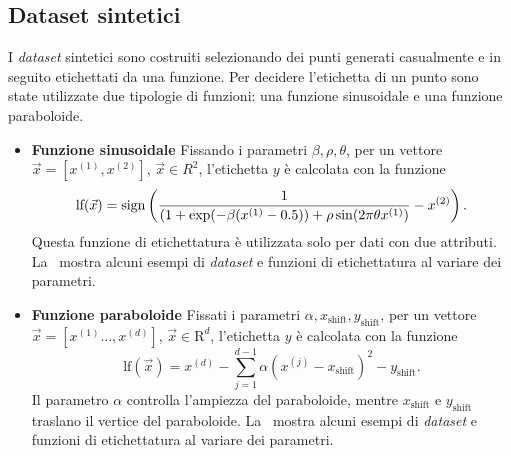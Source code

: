 \subsection{Dataset sintetici}
I \emph{dataset} sintetici sono costruiti selezionando dei punti generati casualmente e in seguito etichettati da una funzione.
Per decidere l'etichetta di un punto sono state utilizzate due tipologie di funzioni: una funzione sinusoidale e una funzione paraboloide.
\begin{itemize}
    \item \textbf{Funzione sinusoidale} Fissando i parametri $\beta,\rho,\theta$, per un vettore $\Vec{x}=[x^{(1)},x^{(2)}]$, $\Vec{x} \in R^2$, l'etichetta $y$ è calcolata con la funzione
    \begin{equation}\label{eq:sinusoid_dataset_lf}
    \textrm{lf}(\Vec{x}) = \mathrm{sign}\left(\frac{1}{(1 + \exp(-\beta(x^{(1)} - 0.5)) + \rho \sin(2\pi\theta x^{(1)})} - x^{(2)}\right).
    \end{equation}
    Questa funzione di etichettatura è utilizzata solo per dati con due attributi. La~ mostra alcuni esempi di \emph{dataset} e funzioni di etichettatura al variare dei parametri.

    \item \textbf{Funzione paraboloide} Fissati i parametri $\alpha, x_\text{shift}, y_\text{shift}$, per un vettore $\Vec{x}=[x^{(1)}\dots, x^{(d)}]$, $\Vec{x} \in \mathrm{R}^d$, l'etichetta $y$ è calcolata con la funzione
    \begin{equation}\label{eq:pacman_dataset_lf}
    \textrm{lf}(\Vec{x})= x^{(d)} - \sum_{j=1}^{d-1}\alpha(x^{(j)} - x_\text{shift})^2 - y_\text{shift}.
    \end{equation}
    Il parametro $\alpha$ controlla l'ampiezza del paraboloide, mentre $x_\text{shift}$ e $y_\text{shift}$ traslano il vertice del paraboloide.
    La~ mostra alcuni esempi di \emph{dataset} e funzioni di etichettatura al variare dei parametri.
\end{itemize}
